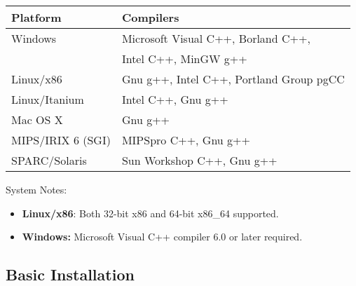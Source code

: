 \begin{center}
\begin{tabular}{|l|l|}\hline
Platform & Compilers \\ \hline
Windows &
Microsoft Visual C++, Borland C++, \\
 & Intel C++, MinGW g++
\\
Linux/x86 & Gnu g++, Intel C++, Portland Group pgCC \\
Linux/Itanium & Intel C++, Gnu g++ \\
Mac OS X & Gnu g++ \\
MIPS/IRIX 6 (SGI) & MIPSpro C++, Gnu g++ \\
SPARC/Solaris & Sun Workshop C++, Gnu g++ \\ \hline
\end{tabular}
\end{center}

\par\noindent
System Notes:
\begin{itemize}
\item \textbf{Linux/x86}: Both 32-bit x86 and 64-bit x86\_64 supported.
\item \textbf{Windows:} Microsoft Visual C++ compiler 6.0 or later required.
\end{itemize}

\subsection{Basic Installation}

